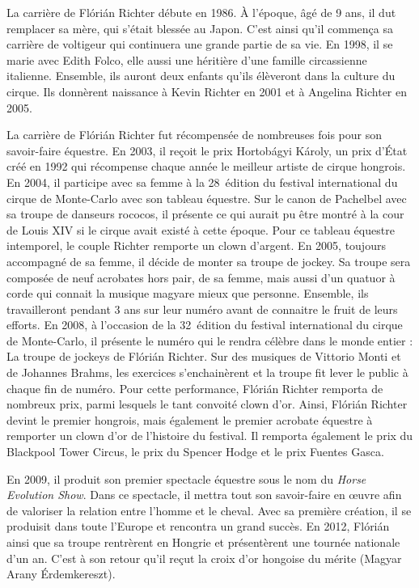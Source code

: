 La carrière de Flórián Richter débute en 1986. À l’époque, âgé de 9 ans, il dut remplacer sa mère, qui s’était blessée au Japon. C’est ainsi qu’il commença sa carrière de voltigeur qui continuera une grande partie de sa vie. En 1998, il se marie avec Edith Folco, elle aussi une héritière d’une famille circassienne italienne. Ensemble, ils auront deux enfants qu’ils élèveront dans la culture du cirque. Ils donnèrent naissance à Kevin Richter en 2001 et à Angelina Richter en 2005.

La carrière de Flórián Richter fut récompensée de nombreuses fois pour son savoir-faire équestre. En 2003, il reçoit le prix Hortobágyi Károly, un prix d’État créé en 1992 qui récompense chaque année le meilleur artiste de cirque hongrois. En 2004, il participe avec sa femme à la 28\ieme~édition du festival international du cirque de Monte-Carlo avec son tableau équestre. Sur le canon de Pachelbel avec sa troupe de danseurs rococos, il présente ce qui aurait pu être montré à la cour de Louis XIV si le cirque avait existé à cette époque. Pour ce tableau équestre intemporel, le couple Richter remporte un clown d’argent. En 2005, toujours accompagné de sa femme, il décide de monter sa troupe de jockey. Sa troupe sera composée de neuf acrobates hors pair, de sa femme, mais aussi d’un quatuor à corde qui connait la musique magyare mieux que personne. Ensemble, ils travailleront pendant 3 ans sur leur numéro avant de connaitre le fruit de leurs efforts. En 2008, à l’occasion de la 32\ieme~édition du festival international du cirque de Monte-Carlo, il présente le numéro qui le rendra célèbre dans le monde entier : La troupe de jockeys de Flórián Richter. Sur des musiques de Vittorio Monti et de Johannes Brahms, les exercices s’enchainèrent et la troupe fit lever le public à chaque fin de numéro. Pour cette performance, Flórián Richter remporta de nombreux prix, parmi lesquels le tant convoité clown d’or. Ainsi, Flórián Richter devint le premier hongrois, mais également le premier acrobate équestre à remporter un clown d’or de l’histoire du festival. Il remporta également le prix du Blackpool Tower Circus, le prix du Spencer Hodge et le prix Fuentes Gasca.

En 2009, il produit son premier spectacle équestre sous le nom du \textit{Horse Evolution Show}. Dans ce spectacle, il mettra tout son savoir-faire en œuvre afin de valoriser la relation entre l’homme et le cheval. Avec sa première création, il se produisit dans toute l’Europe et rencontra un grand succès. En 2012, Flórián ainsi que sa troupe rentrèrent en Hongrie et présentèrent une tournée nationale d’un an. C’est à son retour qu’il reçut la croix d’or hongoise du mérite (Magyar Arany Érdemkereszt).

